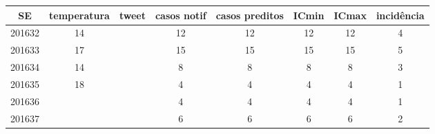 \begin{tabular}{c|ccccccc}
  \hline
SE & temperatura & tweet & casos notif & casos preditos & ICmin & ICmax & incidência \\ 
  \hline
201632 & 14 &  & 12 & 12 & 12 & 12 & 4 \\ 
  201633 & 17 &  & 15 & 15 & 15 & 15 & 5 \\ 
  201634 & 14 &  & 8 & 8 & 8 & 8 & 3 \\ 
  201635 & 18 &  & 4 & 4 & 4 & 4 & 1 \\ 
  201636 &  &  & 4 & 4 & 4 & 4 & 1 \\ 
  201637 &  &  & 6 & 6 & 6 & 6 & 2 \\ 
   \hline
\end{tabular}
